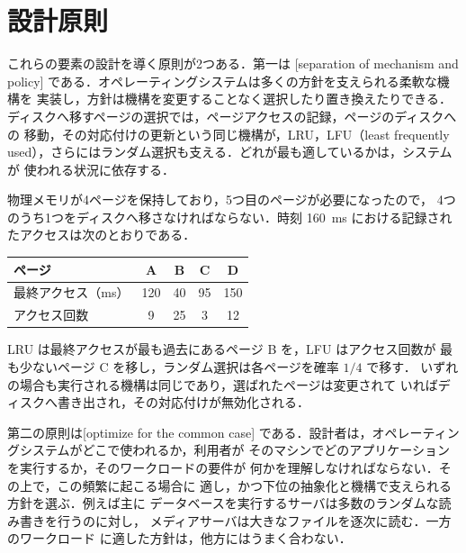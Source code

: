 \documentclass[../main.tex]{subfiles}
\begin{document}
\section{設計原則}
\label{sec:l01-principles}

これらの要素の設計を導く原則が2つある．第一は
[separation of mechanism and policy]%
である．オペレーティングシステムは多くの方針を支えられる柔軟な機構を
実装し，方針は機構を変更することなく選択したり置き換えたりできる．
ディスクへ移すページの選択では，ページアクセスの記録，ページのディスクへの
移動，その対応付けの更新という同じ機構が，LRU，LFU（least frequently
used），さらにはランダム選択も支える．どれが最も適しているかは，システムが
使われる状況に依存する．

\begin{example}
  物理メモリが4ページを保持しており，5つ目のページが必要になったので，
  4つのうち1つをディスクへ移さなければならない．時刻
  \SI{160}{\milli\second} における記録されたアクセスは次のとおりである．
  \begin{center}
    \small
    \begin{tabular}{@{}lcccc@{}}
      \toprule
      ページ & A & B & C & D \\
      \midrule
      最終アクセス（\si{\milli\second}） & 120 & 40 & 95 & 150 \\
      アクセス回数 & 9 & 25 & 3 & 12 \\
      \bottomrule
    \end{tabular}
  \end{center}
  LRU は最終アクセスが最も過去にあるページ B を，LFU はアクセス回数が
  最も少ないページ C を移し，ランダム選択は各ページを確率 $1/4$ で移す．
  いずれの場合も実行される機構は同じであり，選ばれたページは変更されて
  いればディスクへ書き出され，その対応付けが無効化される．
\end{example}

第二の原則は[optimize for the common case]%
である．設計者は，オペレーティングシステムがどこで使われるか，利用者が
そのマシンでどのアプリケーションを実行するか，そのワークロードの要件が
何かを理解しなければならない．その上で，この頻繁に起こる場合に
適し，かつ下位の抽象化と機構で支えられる方針を選ぶ．例えば主に
データベースを実行するサーバは多数のランダムな読み書きを行うのに対し，
メディアサーバは大きなファイルを逐次に読む．一方のワークロード
に適した方針は，他方にはうまく合わない．
\end{document}
